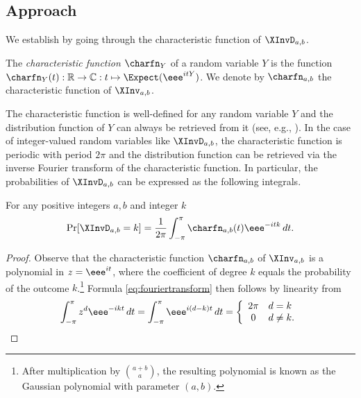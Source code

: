 \subsection{Approach}

We establish  by going through the characteristic function of $\XInvD_{a,b}$. 
\begin{definition}
The \emph{characteristic function} $\charfn_Y$ of a random variable $Y$ is the function $\charfn_Y(t):\mathbb{R}\to\mathbb{C}: t \mapsto \Expect(\eee^{itY})$. We denote by $\charfn_{a,b}$ the characteristic function of $\XInv_{a,b}$.
\end{definition}
The characteristic function is well-defined for any random variable $Y$ and the distribution function of $Y$ can always be retrieved from it (see, e.g., \cite[Chapter VI]{Renyi}). In the case of integer-valued random variables like $\XInvD_{a,b}$, the characteristic function is periodic with period $2\pi$ and the distribution function can be retrieved via the inverse Fourier transform of the characteristic function. In particular, the probabilities of $\XInvD_{a,b}$ can be expressed as the following integrals.
\begin{fact}
For any positive integers $a,b$ and integer $k$
\begin{equation}
    \label{eq:fouriertransform}
    \Pr[\XInvD_{a,b}=k] = \frac{1}{2\pi} \int_{-\pi}^{\pi}\charfn_{a,b}(t)\eee^{-itk}\,dt.
\end{equation}
\end{fact}
\begin{proof}
Observe that the characteristic function $\charfn_{a,b}$ of $\XInv_{a,b}$ is a polynomial in $z=\eee^{it}$, where the coefficient of degree $k$ equals the probability of the outcome $k$.\footnote{After multiplication by $\binom{a+b}{a}$, the resulting polynomial is known as the Gaussian polynomial with parameter $(a,b)$.} 
Formula \eqref{eq:fouriertransform} then follows by linearity from
\[
\int_{-\pi}^\pi z^d \eee^{-ikt} \, dt = 
\int_{-\pi}^\pi \eee^{i(d-k)t} \, dt =
\left\{ \begin{array}{cl} 2\pi & d=k \\
                             0 & d \ne k.
\end{array} \right.
\]
\end{proof}

